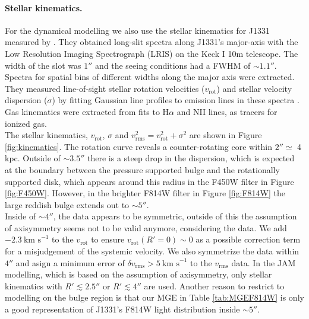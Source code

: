 \paragraph{Stellar kinematics.} For the dynamical modelling we also use the stellar kinematics for J1331 measured by \citet{SWELLSV}. They obtained long-slit spectra along J1331's major-axis with the Low Resolution Imaging Spectrograph (LRIS) on the Keck I 10m telescope. The width of the slot was $1''$ and the seeing conditions had a FWHM of $\sim 1.1''$. Spectra for spatial bins of different widths along the major axis were extracted. They measured line-of-sight stellar rotation velocities ($v_\text{rot}$) and stellar velocity dispersion ($\sigma$) by fitting Gaussian line profiles to emission  lines in these spectra . Gas kinematics were extracted from fits to H$\alpha$ and NII lines, as tracers for ionized gas.
\\The stellar kinematics, $v_\text{rot}$, $\sigma$ and $v_\text{rms}^2=v_\text{rot}^2 + \sigma^2$ are shown in Figure \ref{fig:kinematics}. The rotation curve reveals a counter-rotating core within $2''\simeq$ 4 kpc. Outside of $\sim 3.5''$ there is a steep drop in the dispersion, which is expected at the boundary between the pressure supported bulge and the rotationally supported disk, which appears around this radius in the F450W filter in Figure \ref{fig:F450W}. However, in the brighter F814W filter in Figure \ref{fig:F814W}  the large reddish bulge extends out to $\sim5''$. 
\\Inside of $\sim 4''$, the data appears to be symmetric, outside of this the assumption of axisymmetry seems not to be valid anymore, considering the data. We add $-2.3~\text{km s}^{-1}$ to the $v_\text{rot}$ to ensure $v_\text{rot}(R'=0) \sim 0$ as a possible correction term for a misjudgement of the systemic velocity. We also symmetrize the data within $4''$ and asign a minimum error of $\delta v_\text{rms} > 5~\text{km s}^{-1}$ to the $v_\text{rms}$ data. In the JAM modelling, which is based on the assumption of axisymmetry, only stellar kinematics with $R'  \lesssim 2.5''$ or $R' \lesssim 4''$ are used. Another reason to restrict to modelling on the bulge region is that our MGE in Table \ref{tab:MGEF814W} is only a good representation of J1331's F814W light distribution inside $\sim 5''$.